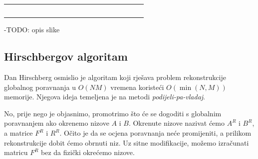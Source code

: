 \documentclass[times, utf8, zavrsni]{fer}
\begin{document}
\begin{tabularx}{400pt}{|R|R|R|R|R|R|R|R|R|R|R|R|R|R|R|R|R|R|R|R|}
 \hline
  &  &  &  &  &  &  &  &  &  &  &  &  &  &  &  &  &  &  &  \\ \hline
  &  &  &  &  &  &  &  &  &  &  &  &  &  &  &  &  &  &  &  \\ \hline
  &  &  &  &  &  &  &  &  &  &  &  &  &  &  &  &  &  &  &  \\ \hline
  &  &  &  &  &  &  &  &   &   &   &   &   &   &   &   &   &   &   &   \\ \hline
   &   &   &   &   &   &   &   &   &   &  &  &  &  &  &  &  &  &  &  \\ \hline
  &  &  &  &  &  &  &  &  &  &  &  &  &  &  &  &  &  &  &  \\ \hline
\end{tabularx}

-TODO: opis slike

\subsection{Hirschbergov algoritam}
Dan Hirschberg osmislio je algoritam koji rješava problem rekonstrukcije
globalnog poravnanja u $O(NM)$ vremena koristeći $O(\min(N, M))$ memorije.
Njegova ideja temeljena je na metodi \textit{podijeli-pa-vladaj}.

No, prije nego je objasnimo, promotrimo što će se dogoditi s globalnim
poravnanjem ako okrenemo nizove $A$ i $B$. Okrenute nizove nazivat ćemo
$A^R$ i $B^R$, a matrice $F^R$ i $R^R$. Očito je da se ocjena poravnanja
neće  promijeniti, a prilikom rekonstrukcije dobit ćemo obrnuti niz. Uz sitne
modifikacije, možemo izračunati matricu $F^R$ bez da fizički okrećemo
nizove. 
\end{document}
